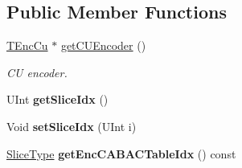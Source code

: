 \subsection*{Public Member Functions}
\begin{DoxyCompactItemize}
\item 
\mbox{\label{class_t_enc_slice_a97f23366a5bac19670b9cbea3195aa2a}} 
\hyperlink{class_t_enc_cu}{T\+Enc\+Cu} $\ast$ \hyperlink{class_t_enc_slice_a97f23366a5bac19670b9cbea3195aa2a}{get\+C\+U\+Encoder} ()
\begin{DoxyCompactList}\small\item\em CU encoder. \end{DoxyCompactList}\item 
\mbox{\label{class_t_enc_slice_a9ed458ff379c498313ea1cf61137d175}} 
U\+Int {\bfseries get\+Slice\+Idx} ()
\item 
\mbox{\label{class_t_enc_slice_a2df1ce2fb9b28d5a5d8f4498b5ceb658}} 
Void {\bfseries set\+Slice\+Idx} (U\+Int i)
\item 
\mbox{\label{class_t_enc_slice_a3863b7c2ba5227e89297a54cac4d8302}} 
\hyperlink{_type_def_8h_a8fc5fd31653a387f7430d29863620f71}{Slice\+Type} {\bfseries get\+Enc\+C\+A\+B\+A\+C\+Table\+Idx} () const
\end{DoxyCompactItemize}
